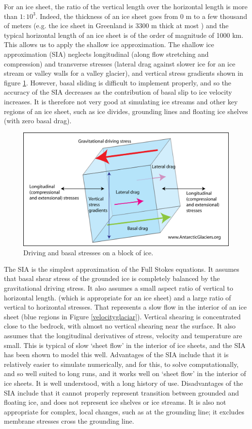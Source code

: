 \documentclass{article}
\begin{document}
For an ice sheet, the ratio of the vertical length over the horizontal length is more than $1:10^3$. Indeed, the thickness of an ice sheet goes from 0 m to a few thousand of meters (e.g. the ice sheet in Greenland is 3300 m thick at most \cite[]{bamber2001new}) and the typical horizontal length of an ice sheet is of the order of magnitude of 1000 km. This allows us to apply the shallow ice approximation. The shallow ice approximation (SIA) neglects longitudinal (along flow stretching and compression) and transverse stresses (lateral drag against slower ice for an ice stream or valley walls for a valley glacier), and vertical stress gradients shown in figure \ref{nine_stresses}. However, basal sliding is difficult to implement properly, and so the accuracy of the SIA decreases as the contribution of basal slip to ice velocity increases. It is therefore not very good at simulating ice streams and other key regions of an ice sheet, such as ice divides, grounding lines and floating ice shelves (with zero basal drag). 
\begin{figure}[!h]
	\centering
	\includegraphics[width=0.7\linewidth]{../fig/nine-stresses.png}
	\caption{Driving and basal stresses on a block of ice.}
	\label{nine_stresses}
\end{figure}
The SIA is the simplest approximation of the Full Stokes equations. It assumes that basal shear stress of the grounded ice is completely balanced by the gravitational driving stress. It also assumes a small aspect ratio of vertical to horizontal length. (which is appropriate for an ice sheet) and a large ratio of vertical to horizontal stresses. That represents a slow flow in the interior of an ice sheet (blue regions in Figure \ref{velocityglaciar}). Vertical shearing is concentrated close to the bedrock, with almost no vertical shearing near the surface. It also assumes that the longitudinal derivatives of stress, velocity and temperature are small. This is typical of slow ‘sheet flow’ in the interior of ice sheets, and the SIA has been shown to model this well.
Advantages of the SIA include that it is relatively easier to simulate numerically, and for this, to solve computationally, and so well suited to long runs, and it works well on ‘sheet flow’ in the interior of ice sheets. It is well understood, with a long history of use. Disadvantages of the SIA include that it cannot properly represent transition between grounded and floating ice, and does not represent ice shelves or ice streams. It is also not appropriate for complex, local changes, such as at the grounding line; it excludes membrane stresses cross the grounding line.
\end{document}
